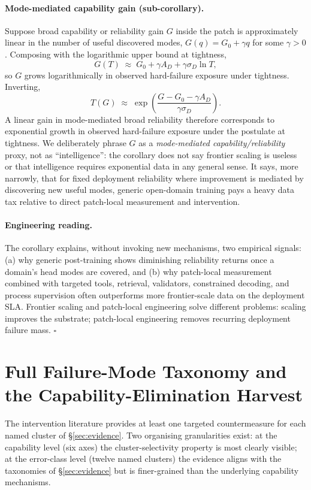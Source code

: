 \documentclass{article}
\theoremstyle{taeplain}
\theoremstyle{taedefn}
\begin{document}
\paragraph{Mode-mediated capability gain (sub-corollary).}
Suppose broad capability or reliability gain $G$ inside the patch is approximately linear in the number of useful discovered modes, $G(q) = G_0 + \gamma q$ for some $\gamma > 0$. Composing with the logarithmic upper bound at tightness,
\[
G(T) \;\approx\; G_0 + \gamma A_D + \gamma \sigma_D \ln T,
\]
so $G$ grows logarithmically in observed hard-failure exposure under tightness. Inverting,
\[
T(G) \;\approx\; \exp\!\left(\frac{G - G_0 - \gamma A_D}{\gamma \sigma_D}\right).
\]
A linear gain in mode-mediated broad reliability therefore corresponds to exponential growth in observed hard-failure exposure under the postulate at tightness. We deliberately phrase $G$ as a \emph{mode-mediated capability/reliability} proxy, not as ``intelligence'': the corollary does not say frontier scaling is useless or that intelligence requires exponential data in any general sense. It says, more narrowly, that for fixed deployment reliability where improvement is mediated by discovering new useful modes, generic open-domain training pays a heavy data tax relative to direct patch-local measurement and intervention.

\paragraph{Engineering reading.}
The corollary explains, without invoking new mechanisms, two empirical signals: (a) why generic post-training shows diminishing reliability returns once a domain's head modes are covered, and (b) why patch-local measurement combined with targeted tools, retrieval, validators, constrained decoding, and process supervision often outperforms more frontier-scale data on the deployment SLA. Frontier scaling and patch-local engineering solve different problems: scaling improves the substrate; patch-local engineering removes recurring deployment failure mass. $\square$

\section{Full Failure-Mode Taxonomy and the Capability-Elimination Harvest}
\label{app:taxonomy}

The intervention literature provides at least one targeted countermeasure for each named cluster of \S\ref{sec:evidence}. Two organising granularities exist: at the capability level (six axes) the cluster-selectivity property is most clearly visible; at the error-class level (twelve named clusters) the evidence aligns with the taxonomies of \S\ref{sec:evidence} but is finer-grained than the underlying capability mechanisms.
\end{document}
